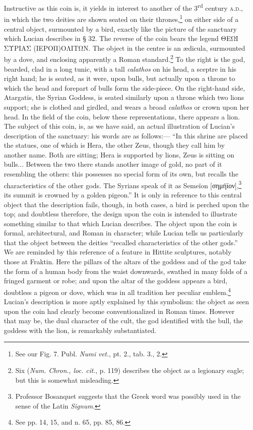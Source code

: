 \documentclass[a4paper, 11pt, oneside, polutonikogreek, english]{article}
\begin{document}
Instructive as this coin is, it yields in interest to another of the 3\textsuperscript{rd} century \textsc{a.d.}, in which the two deities are shown seated on their thrones,\footnote{See our Fig. 7. Publ. \emph{Numi vet.}, pt. 2., tab. 3., 2.} on either side of a central object, surmounted by a bird, exactly like the picture of the sanctuary which Lucian describes in § 32. The reverse of the coin bears the legend ΘΕΩΙ ΣΥΡΙΑΣ (ΙΕΡΟΠ)ΟΛΙΤΩΝ. The object in the centre is an ædicula, surmounted by a dove, and enclosing apparently a Roman standard.\footnote{Six (\emph{Num. Chron., loc. cit.}, p. 119) describes the object as a legionary eagle; but this is somewhat misleading.} To the right is the god, bearded, clad in a long tunic, with a tall \emph{calathos} on his head, a sceptre in his right hand; he is seated, as it were, upon bulls, but actually upon a throne to which the head and forepart of bulls form the side-piece. On the right-hand side, Atargatis, the Syrian Goddess, is seated similarly upon a throne which two lions support; she is clothed and girdled, and wears a broad \emph{calathos} or crown upon her head. In the field of the coin, below these representations, there appears a lion. The subject of this coin, is, as we have said, an actual illustration of Lucian's description of the sanctuary: his words are as follows:--- ``In this shrine are placed the statues, one of which is Hera, the other Zeus, though they call him by another name. Both are sitting; Hera is supported by lions, Zeus is sitting on bulls... Between the two there stands another image of gold, no part of it resembling the others: this possesses no special form of its own, but recalls the characteristics of the other gods. The Syrians speak of it as Semeïon [σημήϊον],\footnote{Professor Bosanquet suggests that the Greek word was possibly used in the sense of the Latin \emph{Signum}.} its summit is crowned by a golden pigeon.'' It is only in reference to this central object that the description fails, though, in both cases, a bird is perched upon the top; and doubtless therefore, the design upon the coin is intended to illustrate something similar to that which Lucian describes. The object upon the coin is formal, architectural, and Roman in character; while Lucian tells us particularly that the object between the deities ``recalled characteristics of the other gods.'' We are reminded by this reference of a feature in Hittite sculptures, notably those at Fraktin. Here the pillars of the altars of the goddess and of the god take the form of a human body from the waist downwards, swathed in many folds of a fringed garment or robe; and upon the altar of the goddess appears a bird, doubtless a pigeon or dove, which was in all tradition her peculiar emblem.\footnote{See pp. 14, 15, and n. 65, pp. 85, 86.} Lucian's description is more aptly explained by this symbolism: the object as seen upon the coin had clearly become conventionalized in Roman times. However that may be, the dual character of the cult, the god identified with the bull, the goddess with the lion, is remarkably substantiated.
\end{document}
